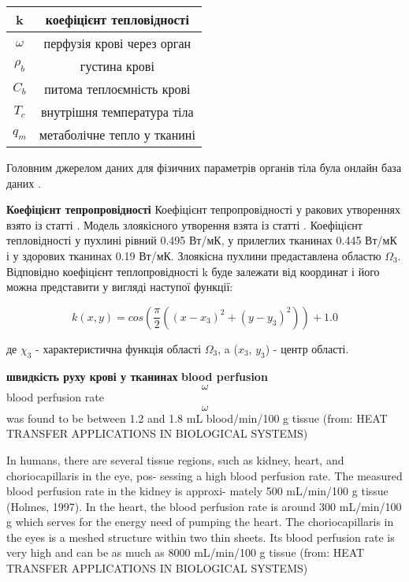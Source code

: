 \begin{center}
    \begin{tabular}{|c|c|} 
        \hline
            k & коефіцієнт тепловідності \\
        \hline
            \(\omega\) & перфузія крові через орган \\
        \hline
            \(\rho_b\) & густина крові \\
        \hline
            \(C_b\) & питома теплоємність крові \\
        \hline
            \(T_c\) & внутрішня температура тіла \\
        \hline
            \(q_m\) & метаболічне тепло у тканині \\
        \hline
    \end{tabular}
\end{center}

Головним джерелом даних для фізичних параметрів органів тіла була онлайн база даних \cite{database-tissue-properties}.

\textbf{Коефіцієнт тепропровідності} Коефіцієнт тепропровідності у ракових утвореннях взято із статті 
\cite{lung-tumor-thermal-conductivity}. Модель злоякісного утворення взята із статті \cite{tumor-thermal-model}.
Коефіцієнт тепловідності у пухлині рівний 0.495 Вт/мК, у прилеглих тканинах 0.445 Вт/мК і у здорових тканинах 
0.19 Вт/мК. Злоякісна пухлини предаставлена областю $\Omega_3$. Відповідно коефіцієнт теплопровідності k буде залежати
від координат і його можна представити у вигляді наступої функції:

\begin{equation}
    \label{eqn:thermo_2d_thermal_conductivity}
    k(x, y) = cos(\frac{\pi}{2}((x - x_3)^2 + (y - y_3)^2)) + 1.0
\end{equation}

\noindent де $\chi_3$ - характеристична функція області $\Omega_3$, a ($x_3$, $y_3$) - центр області.

\textbf{швидкість руху крові у тканинах} \textbf{blood perfusion} $$\omega$$ blood perfusion rate $$\omega$$ was found to be between 1.2 and 1.8 mL
blood/min/100 g tissue (from: HEAT TRANSFER APPLICATIONS IN BIOLOGICAL SYSTEMS)

In humans, there are several tissue regions, such as kidney, heart, and choriocapillaris in the eye, pos-
sessing a high blood perfusion rate. The measured blood perfusion rate in the kidney is approxi-
mately 500 mL/min/100 g tissue (Holmes, 1997). In the heart, the blood perfusion rate is around
300 mL/min/100 g which serves for the energy need of pumping the heart. The choriocapillaris in
the eyes is a meshed structure within two thin sheets. Its blood perfusion rate is very high and can
be as much as 8000 mL/min/100 g tissue (from: HEAT TRANSFER APPLICATIONS IN BIOLOGICAL SYSTEMS)

